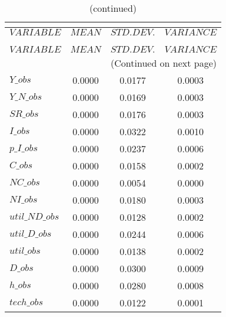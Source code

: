 
\begin{center}
\begin{longtable}{lccc} 
\caption{THEORETICAL MOMENTS}\\
 \label{Table:th_moments}\\
\toprule 
$VARIABLE       $	 & 	 $         MEAN$	 & 	 $    STD. DEV.$	 & 	 $     VARIANCE$\\
\midrule \endfirsthead 
\caption{(continued)}\\
 \toprule \\ 
$VARIABLE       $	 & 	 $         MEAN$	 & 	 $    STD. DEV.$	 & 	 $     VARIANCE$\\
\midrule \endhead 
\midrule \multicolumn{4}{r}{(Continued on next page)} \\ \bottomrule \endfoot 
\bottomrule \endlastfoot 
$Y\_obs         $	 & 	       0.0000	 & 	       0.0177	 & 	       0.0003 \\ 
$Y\_N\_obs      $	 & 	       0.0000	 & 	       0.0169	 & 	       0.0003 \\ 
$SR\_obs        $	 & 	       0.0000	 & 	       0.0176	 & 	       0.0003 \\ 
$I\_obs         $	 & 	       0.0000	 & 	       0.0322	 & 	       0.0010 \\ 
$p\_I\_obs      $	 & 	       0.0000	 & 	       0.0237	 & 	       0.0006 \\ 
$C\_obs         $	 & 	       0.0000	 & 	       0.0158	 & 	       0.0002 \\ 
$NC\_obs        $	 & 	       0.0000	 & 	       0.0054	 & 	       0.0000 \\ 
$NI\_obs        $	 & 	       0.0000	 & 	       0.0180	 & 	       0.0003 \\ 
$util\_ND\_obs  $	 & 	       0.0000	 & 	       0.0128	 & 	       0.0002 \\ 
$util\_D\_obs   $	 & 	       0.0000	 & 	       0.0244	 & 	       0.0006 \\ 
$util\_obs      $	 & 	       0.0000	 & 	       0.0138	 & 	       0.0002 \\ 
$D\_obs         $	 & 	       0.0000	 & 	       0.0300	 & 	       0.0009 \\ 
$h\_obs         $	 & 	       0.0000	 & 	       0.0280	 & 	       0.0008 \\ 
$tech\_obs      $	 & 	       0.0000	 & 	       0.0122	 & 	       0.0001 \\ 
\end{longtable}
 \end{center}
